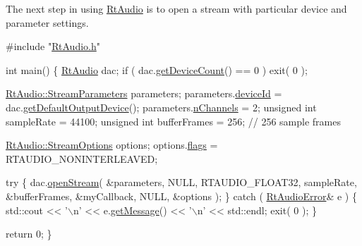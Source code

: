 The next step in using \hyperlink{class_rt_audio}{Rt\+Audio} is to open a stream with particular device and parameter settings.


\begin{DoxyCode}
\textcolor{preprocessor}{#include "\hyperlink{_rt_audio_8h}{RtAudio.h}"}

\textcolor{keywordtype}{int} main()
\{
  \hyperlink{class_rt_audio}{RtAudio} dac;
  \textcolor{keywordflow}{if} ( dac.\hyperlink{class_rt_audio_a747ce2d73803641bbb66d6e78092aa1a}{getDeviceCount}() == 0 ) exit( 0 );

  \hyperlink{struct_rt_audio_1_1_stream_parameters}{RtAudio::StreamParameters} parameters;
  parameters.\hyperlink{struct_rt_audio_1_1_stream_parameters_ab3c72bcf3ef12149ae9a4fb597cc5489}{deviceId} = dac.\hyperlink{class_rt_audio_a3a3f3dbe13ea696b521e49cdaaa357bc}{getDefaultOutputDevice}();
  parameters.\hyperlink{struct_rt_audio_1_1_stream_parameters_a88a10091b6e284e21235cc6f25332ebd}{nChannels} = 2;
  \textcolor{keywordtype}{unsigned} \textcolor{keywordtype}{int} sampleRate = 44100;
  \textcolor{keywordtype}{unsigned} \textcolor{keywordtype}{int} bufferFrames = 256; \textcolor{comment}{// 256 sample frames}

  \hyperlink{struct_rt_audio_1_1_stream_options}{RtAudio::StreamOptions} options;
  options.\hyperlink{struct_rt_audio_1_1_stream_options_a0ecc98b031aa3af49d09b781643e298b}{flags} = RTAUDIO\_NONINTERLEAVED;

  \textcolor{keywordflow}{try} \{
    dac.\hyperlink{class_rt_audio_a6907539d2527775df778ebce32ef1e3b}{openStream}( &parameters, NULL, RTAUDIO\_FLOAT32,
                    sampleRate, &bufferFrames, &myCallback, NULL, &options );
  \}
  \textcolor{keywordflow}{catch} ( \hyperlink{class_rt_audio_error}{RtAudioError}& e ) \{
    std::cout << \textcolor{charliteral}{'\(\backslash\)n'} << e.\hyperlink{class_rt_audio_error_af1e84bd3ebc86210a723d1839b4f9cbf}{getMessage}() << \textcolor{charliteral}{'\(\backslash\)n'} << std::endl;
    exit( 0 );
  \}
  
  \textcolor{keywordflow}{return} 0;
\}
\end{DoxyCode}


